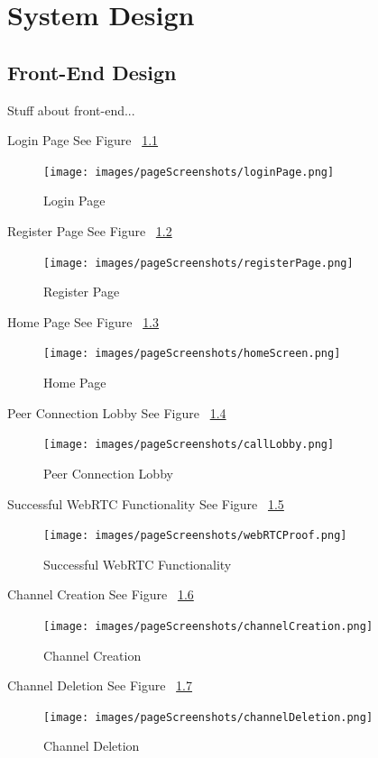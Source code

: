 \chapter{System Design}
\section{Front-End Design}
Stuff about front-end...

Login Page See Figure ~\ref{image:loginPage}
\begin{figure}[h!]
    \caption{Login Page}
    \label{image:loginPage}
    \centering
    \texttt{[image: images/pageScreenshots/loginPage.png]}
\end{figure}

Register Page See Figure ~\ref{image:registerPage}
\begin{figure}[h!]
    \caption{Register Page}
    \label{image:registerPage}
    \centering
    \texttt{[image: images/pageScreenshots/registerPage.png]}
\end{figure}

Home Page See Figure ~\ref{image:homePage}
\begin{figure}[h!]
    \caption{Home Page}
    \label{image:homePage}
    \centering
    \texttt{[image: images/pageScreenshots/homeScreen.png]}
\end{figure}

Peer Connection Lobby See Figure ~\ref{image:peerConnectionLobby}
\begin{figure}[h!]
    \caption{Peer Connection Lobby}
    \label{image:peerConnectionLobby}
    \centering
    \texttt{[image: images/pageScreenshots/callLobby.png]}
\end{figure}

Successful WebRTC Functionality See Figure ~\ref{image:webRTCProof}
\begin{figure}[h!]
    \caption{Successful WebRTC Functionality}
    \label{image:webRTCProof}
    \centering
    \texttt{[image: images/pageScreenshots/webRTCProof.png]}
\end{figure}

Channel Creation See Figure ~\ref{image:channelCreation}
\begin{figure}[h!]
    \caption{Channel Creation}
    \label{image:channelCreation}
    \centering
    \texttt{[image: images/pageScreenshots/channelCreation.png]}
\end{figure}

Channel Deletion See Figure ~\ref{image:channelDeletion}
\begin{figure}[h!]
    \caption{Channel Deletion}
    \label{image:channelDeletion}
    \centering
    \texttt{[image: images/pageScreenshots/channelDeletion.png]}
\end{figure}

